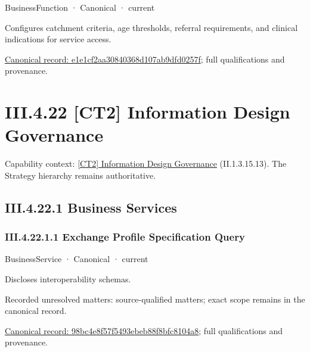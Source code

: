 \label{element:e1e1cf2aa30840368d107ab9dfd0257f}
{\small BusinessFunction · Canonical · current}\par

Configures catchment criteria, age thresholds, referral requirements, and clinical indications for service access.


{\footnotesize \href{../../../../continuum/business/business-function/e1e1cf2aa30840368d107ab9dfd0257f.md}{Canonical record: e1e1cf2aa30840368d107ab9dfd0257f}; full qualifications and provenance.}\par
\section*{III.4.22 [CT2] Information Design Governance}
\label{navigation:III.4.22}

{\small Capability context: \hyperref[element:f39ed9ebcc724857a4bf7a2b8e045c7a]{[CT2] Information Design Governance} (II.1.3.15.13). The Strategy hierarchy remains authoritative.}\par
\subsection*{III.4.22.1 Business Services}
\label{navigation:III.4.22.1}

\subsubsection*{III.4.22.1.1 Exchange Profile Specification Query}
\label{navigation:III.4.22.1.1}

\label{element:98bc4e8f57f5493ebeb88f8bfc8104a8}
{\small BusinessService · Canonical · current}\par

Discloses interoperability schemas.


{\small Recorded unresolved matters: source-qualified matters; exact scope remains in the canonical record.}\par
{\footnotesize \href{../../../../continuum/business/business-service/98bc4e8f57f5493ebeb88f8bfc8104a8.md}{Canonical record: 98bc4e8f57f5493ebeb88f8bfc8104a8}; full qualifications and provenance.}\par
